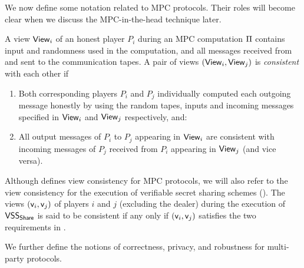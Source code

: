  We now define some {notation} related to MPC protocols. Their roles will become clear when we discuss the MPC-in-the-head technique later. 
\begin{definition}
\label{def:view-consistency}
A view $\mathsf{View}_i$ of an honest player $P_i$ during an MPC computation $\mathrm{\Pi}$ contains input and randomness used in the computation, and all messages received from and sent to the communication tapes. A pair of views $(\mathsf{View}_i,\mathsf{View}_j)$ is {\em consistent} with each other if 
\begin{enumerate}
  \item Both corresponding players $P_i$ and $P_j$ individually computed each outgoing message honestly by using the random tapes, inputs and incoming messages specified in $\mathsf{View}_i$ and $\mathsf{View}_j$ respectively, and:
  \item All output messages of $P_i$ to $P_j$ appearing in $\mathsf{View}_i$ are consistent with incoming messages of $P_j$ received from $P_i$ appearing in $\mathsf{View}_j$ (and vice versa).  
\end{enumerate}   
\end{definition}
\begin{remark}\label{rmk:VSS:view-consistency}
Although  defines view consistency for MPC protocols, we will also refer to the view consistency for the execution of verifiable secret sharing schemes (). The views $(\mathsf{v}_i, \mathsf{v}_j)$ of players $i$ and $j$ (excluding the dealer) during the execution of $\mathsf{VSS}_\mathsf{Share}$ is said to be consistent if any only if $(\mathsf{v}_i, \mathsf{v}_j)$ satisfies the two requirements in .
\end{remark}

We further define the notions of correctness, privacy, and robustness for multi-party protocols. 

